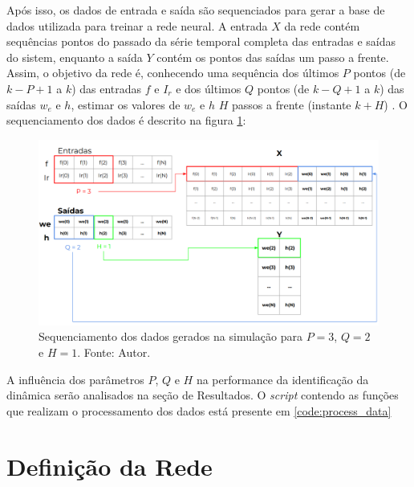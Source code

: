Após isso, os dados de entrada e saída são sequenciados para gerar a base de dados utilizada para treinar a rede neural. A entrada $X$ da rede contém sequências pontos do passado da série temporal completa das entradas e saídas do sistem, enquanto a saída $Y$ contém os pontos das saídas um passo a frente. Assim, o objetivo da rede é, conhecendo uma sequência dos últimos $P$ pontos (de $k-P+1$ a $k$) das entradas $f$ e $I_r$ e dos últimos $Q$ pontos (de $k-Q+1$ a $k$) das saídas $w_e$ e $h$, estimar os valores de $w_e$ e $h$ $H$ passos a frente (instante $k+H$) \cite{miriyala2020deep}. O sequenciamento dos dados é descrito na figura \ref{fig:data_sequencing}:

\begin{figure}[hbt!]
    \centering
    \includegraphics[width=\linewidth]{Imagens/chap03/data_sequencing.png}
    \caption{Sequenciamento dos dados gerados na simulação para $P=3$, $Q=2$ e $H=1$. Fonte: Autor.}
    \label{fig:data_sequencing}
\end{figure}

A influência dos parâmetros $P$, $Q$ e $H$ na performance da identificação da dinâmica serão analisados na seção de Resultados. O \textit{script} contendo as funções que realizam o processamento dos dados está presente em \ref{code:process_data}

\section{Definição da Rede}
